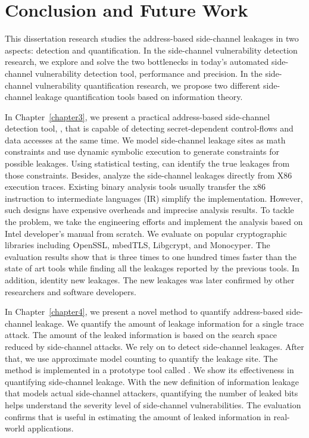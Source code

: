 \chapter{Conclusion and Future Work}\label{chapter6}
This dissertation research studies the address-based side-channel leakages in two aspects: detection and quantification. In the side-channel vulnerability detection research, we explore and solve the two bottlenecks in today's automated side-channel vulnerability detection tool, performance and precision. In the side-channel vulnerability quantification research, we propose two different side-channel leakage quantification tools based on information theory. 

In Chapter~\ref{chapter3}, we present a practical address-based side-channel detection tool, \detect{}, that is capable of detecting secret-dependent control-flows and data accesses at the same time. We model side-channel leakage sites as math constraints and use dynamic symbolic execution to generate constraints for possible leakages. Using statistical testing, \detect{} can identify the true leakages from those constraints. Besides, \detect{} analyze the side-channel leakages directly from X86 execution traces. Existing binary analysis tools usually transfer the x86 instruction to intermediate languages (IR) simplify the implementation. However, such designs have expensive overheads and imprecise analysis results. To tackle the problem, we take the engineering efforts and implement the analysis based on Intel developer's manual from scratch. We evaluate \detect{} on popular cryptographic libraries including OpenSSL, mbedTLS, Libgcrypt, and Monocyper. The evaluation results show that \detect{} is three times to one hundred times faster than the state of art tools while finding all the leakages reported by the previous tools. In addition, \detect{} identity new leakages. The new leakages was later confirmed by other researchers and software developers.  

In Chapter~\ref{chapter4}, we present a novel method to quantify address-based side-channel leakage. We quantify the amount of leakage information for a single trace attack. The amount of the leaked information is based on the search space reduced by side-channel attacks. We rely on \detect{} to detect side-channel leakages. After that, we use approximate model counting to quantify the leakage site. The method is implemented in a prototype tool called \tool{}. We show its effectiveness in quantifying side-channel leakage. With the new definition of information leakage that models actual side-channel attackers, quantifying the number of leaked bits helps understand the severity level of side-channel vulnerabilities. The evaluation confirms that \tool{} is useful in estimating the amount of leaked information in real-world applications.

